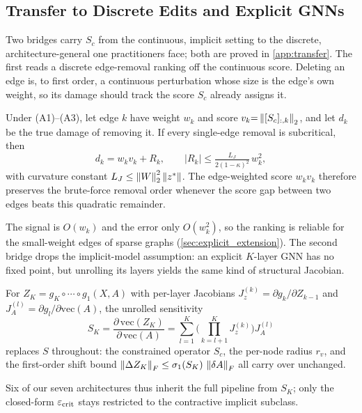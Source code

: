 \subsection{Transfer to Discrete Edits and Explicit GNNs}
\label{sec:transfer_explicit}
Two bridges carry $S_c$ from the continuous, implicit setting to the discrete, architecture-general one practitioners face; both are proved in \cref{app:transfer}. The first reads a discrete edge-removal ranking off the continuous score. Deleting an edge is, to first order, a continuous perturbation whose size is the edge's own weight, so its damage should track the score $S_c$ already assigns it.

\begin{proposition}
\label{prop:transfer}
Under \textnormal{(A1)--(A3)}, let edge $k$ have weight $w_k$ and score $v_k{=}\left\|[S_c]_{:,k}\right\|_2$, and let $d_k$ be the true damage of removing it. If every single-edge removal is subcritical, then
\begin{equation}
d_k = w_k v_k + R_k, \qquad |R_k|\le \tfrac{L_J}{2(1-\kappa)^2}\,w_k^2,
\label{eq:transfer}
\end{equation}
with curvature constant $L_J\le\left\|W\right\|_2^2\left\|z^{*}\right\|$. The edge-weighted score $w_k v_k$ therefore preserves the brute-force removal order whenever the score gap between two edges beats this quadratic remainder.
\end{proposition}

The signal is $O(w_k)$ and the error only $O(w_k^2)$, so the ranking is reliable for the small-weight edges of sparse graphs (\cref{sec:explicit_extension}). The second bridge drops the implicit-model assumption: an explicit $K$-layer GNN has no fixed point, but unrolling its layers yields the same kind of structural Jacobian.

\begin{proposition}
\label{prop:explicit}
For $Z_K{=}g_K\!\circ\!\cdots\!\circ\! g_1(X,A)$ with per-layer Jacobians $J_z^{(k)}{=}\partial g_k/\partial Z_{k-1}$ and $J_A^{(l)}{=}\partial g_l/\partial\mathrm{vec}(A)$, the unrolled sensitivity
\begin{equation}
S_K=\frac{\partial\,\mathrm{vec}(Z_K)}{\partial\,\mathrm{vec}(A)}=\sum_{l=1}^{K}\Big(\prod_{k=l+1}^{K}J_z^{(k)}\Big)J_A^{(l)}
\label{eq:unrolled}
\end{equation}
replaces $S$ throughout: the constrained operator $S_c$, the per-node radius $r_v$, and the first-order shift bound $\left\|\Delta Z_K\right\|_F\le\sigma_1(S_K)\,\left\|\delta A\right\|_F$ all carry over unchanged.
\end{proposition}

Six of our seven architectures thus inherit the full pipeline from $S_K$; only the closed-form $\varepsilon_{\mathrm{crit}}$ stays restricted to the contractive implicit subclass.
